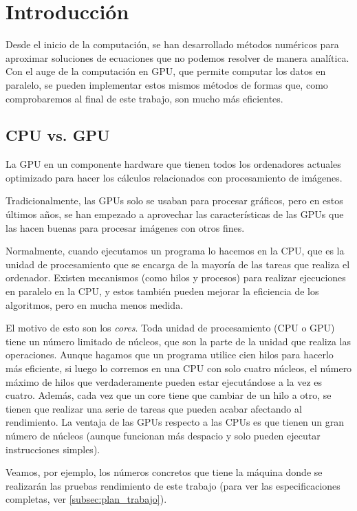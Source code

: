 \chapter{Introducción}
\label{cap:introduccion}


Desde el inicio de la computación, se han desarrollado métodos numéricos para aproximar soluciones de ecuaciones que no podemos resolver de manera analítica. Con el auge de la computación en \ac{GPU}, que permite computar los datos en paralelo, se pueden implementar estos mismos métodos de formas que, como comprobaremos al final de este trabajo, son mucho más eficientes.

\section{\acs{CPU} vs. \acs{GPU}}

La \ac{GPU} en un componente hardware que tienen todos los ordenadores actuales optimizado para hacer los cálculos relacionados con procesamiento de imágenes.

Tradicionalmente, las \acs{GPU}s solo se usaban para procesar gráficos, pero en estos últimos años, se han empezado a aprovechar las características de las \acs{GPU}s que las hacen buenas para procesar imágenes con otros fines.

Normalmente, cuando ejecutamos un programa lo hacemos en la \ac{CPU}, que es la unidad de procesamiento que se encarga de la mayoría de las tareas que realiza el ordenador. Existen mecanismos (como hilos y procesos) para realizar ejecuciones en paralelo en la \ac{CPU}, y estos también pueden mejorar la eficiencia de los algoritmos, pero en mucha menos medida.

El motivo de esto son los \emph{cores}. Toda unidad de procesamiento (\ac{CPU} o \ac{GPU}) tiene un número limitado de núcleos, que son la parte de la unidad que realiza las operaciones. Aunque hagamos que un programa utilice cien hilos para hacerlo más eficiente, si luego lo corremos en una \ac{CPU} con solo cuatro núcleos, el número máximo de hilos que verdaderamente pueden estar ejecutándose a la vez es cuatro. Además, cada vez que un core tiene que cambiar de un hilo a otro, se tienen que realizar una serie de tareas que pueden acabar afectando al rendimiento. La ventaja de las \acs{GPU}s respecto a las \ac{CPU}s es que tienen un gran número de núcleos (aunque funcionan más despacio y solo pueden ejecutar instrucciones simples).

Veamos, por ejemplo, los números concretos que tiene la máquina donde se realizarán las pruebas rendimiento de este trabajo (para ver las especificaciones completas, ver \ref{subsec:plan_trabajo}).

